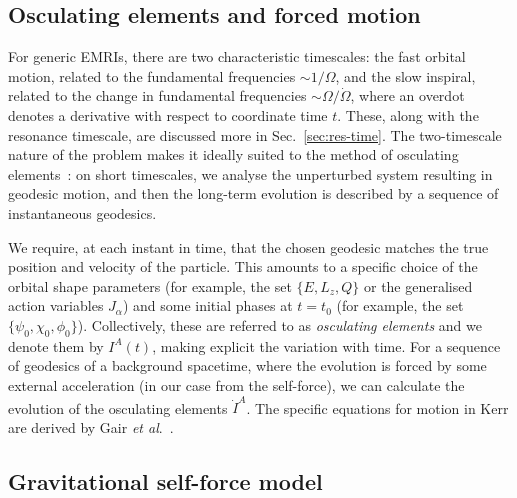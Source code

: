 \documentclass[aps,prd,amsfonts,amssymb,amsmath,nofootinbib,showpacs,superscriptaddress,twocolumn]{revtex4}
\newcommand{\secref}[1]{Sec.~\ref{sec:#1}}
\newcommand{\dd}{\ensuremath{\mathrm{d}}}
\newcommand{\diff}[2]{\ensuremath{\dfrac{\dd {#1}}{\dd {#2}}}}
\newcommand{\difftwo}[2]{\ensuremath{\dfrac{\dd^2 {#1}}{\dd {#2}^2}}}
\begin{document}
\subsection{Osculating elements and forced motion}
\label{sec:forced-motion}

For generic EMRIs, there are two characteristic timescales: the fast orbital motion, related to the fundamental frequencies $\sim1/\Omega$, and the slow inspiral, related to the change in fundamental frequencies $\sim\Omega/\dot{\Omega}$, where an overdot denotes a derivative with respect to coordinate time $t$. These, along with the resonance timescale, are discussed more in \secref{res-time}. The two-timescale nature of the problem makes it ideally suited to the method of osculating elements~\cite{Pound2008,Gair2011a}: on short timescales, we analyse the unperturbed system resulting in geodesic motion, and then the long-term evolution is described by a sequence of instantaneous geodesics.

We require, at each instant in time, that the chosen geodesic matches the true position and velocity of the particle. This amounts to a specific choice of the orbital shape parameters (for example, the set $\{E,L_z,Q\}$ or the generalised action variables $J_\alpha$) and some initial phases at $t=t_0$ (for example, the set $\{\psi_0,\chi_0,\phi_0\}$). Collectively, these are referred to as \emph{osculating elements} and we denote them by $I^A(t)$, making explicit the variation with time. For a sequence of geodesics of a background spacetime, where the evolution is forced by some external acceleration (in our case from the self-force), we can calculate the evolution of the osculating elements $\dot{I}^A$. The specific equations for motion in Kerr are derived by Gair {\it{et al}}.~\cite{Gair2011a}. 


\subsection{Gravitational self-force model}
\label{sec:self-force}
\end{document}
